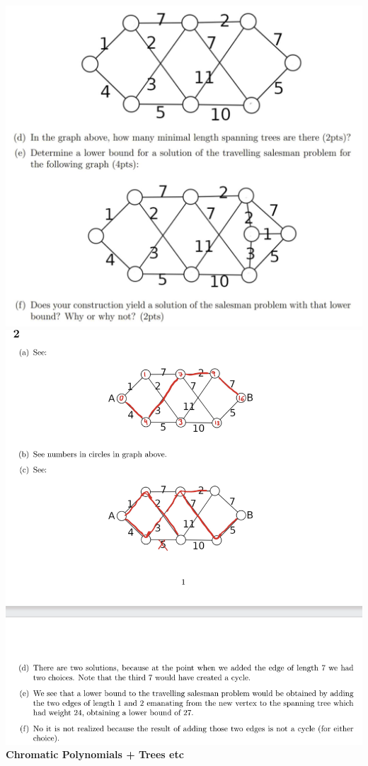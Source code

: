 \documentclass[10pt,landscape]{article}
\begin{document}
\begin{multicols}{2}
\includegraphics[width = 9 cm]{MockQ2p2.png}
\includegraphics[width = 9 cm]{MockA2.png}
\textbf{Chromatic Polynomials + Trees etc}


\end{multicols}
\end{document}
